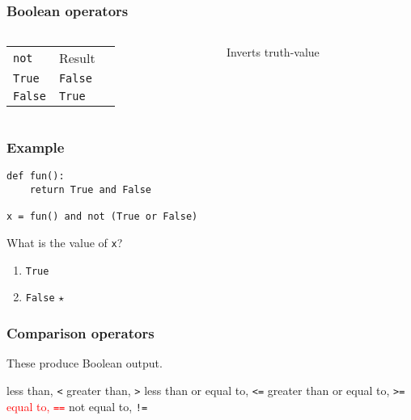 \documentclass[11pt]{beamer}
\begin{document}
\begin{frame}[fragile]
  \frametitle{Boolean operators}
  \Enlarge

  \begin{columns}
  \begin{column}{0.6\textwidth}
  \begin{tabular}{lll}
  \texttt{not}   & Result         \\
  \texttt{True}  & \texttt{False} \\
  \texttt{False} & \texttt{True}  \\
  \end{tabular}
  \end{column}
  \begin{column}{0.4\textwidth}
    Inverts truth-value
  \end{column}
  \end{columns}
\end{frame}

\begin{frame}[fragile]
  \frametitle{Example}
  \Enlarge

  \begin{Verbatim}[commandchars=\\\{\},commentchar=\%]
def fun():
    return True and False

x = fun() and not (True or False)
  \end{Verbatim}
  What is the value of \texttt{x}?
  \begin{enumerate}[label=\Alph*]
  \item  \texttt{True}
  \item  \texttt{False}  $\star$
  \end{enumerate}
\end{frame}

\begin{frame}[fragile]
  \frametitle{Comparison operators}
  \Enlarge

  \begin{itemize}
  \myitem  These produce Boolean output.
    \begin{itemize}
    \mysubitem  less than, \texttt{<}
    \mysubitem  greater than, \texttt{>}
    \mysubitem  less than or equal to, \texttt{<=}
    \mysubitem  greater than or equal to, \texttt{>=}
    \mysubitem  \textcolor{red}{equal to, \texttt{==}}
    \mysubitem  not equal to, \texttt{!=}
    \end{itemize}
  \end{itemize}
\end{frame}
\end{document}
